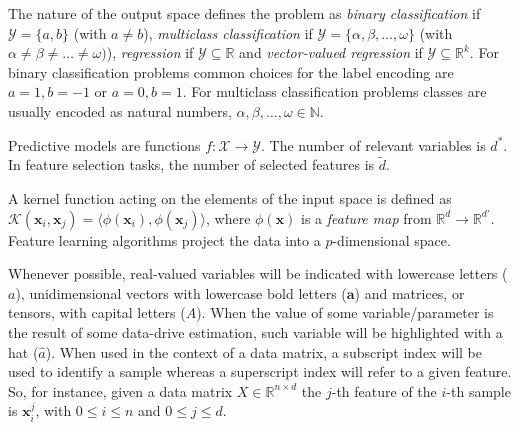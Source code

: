 The nature of the output space defines the problem as \textit{binary classification} if  $\mathcal{Y} = \{a,b\}$ (with $a\neq b$), \textit{multiclass classification} if
$\mathcal{Y} = \{\alpha,\beta,\dots,\omega\}$
(with $\alpha \neq \beta \neq \dots \neq \omega)$),
\textit{regression} if $\mathcal{Y}\subseteq\mathds{R}$ and
\textit{vector-valued regression} if $\mathcal{Y}\subseteq\mathds{R}^k$.
For binary classification problems common choices for the label encoding are $a=1, b=-1$ or $a=0, b=1$.
For multiclass classification problems classes are usually encoded as natural numbers, \ie $\alpha, \beta, \dots, \omega \in \mathbb{N}$.

Predictive models are functions $f: \mathcal{X} \rightarrow \mathcal{Y}$.
The number of relevant variables is $d^*$.
In feature selection tasks, the number of selected features is $\tilde d$.

A kernel function acting on the elements of the input space is defined as $\mathcal{K}(\bm{x}_{i},\bm{x}_{j})=\langle \phi(\bm{x}_{i}), \phi(\bm{x}_{j})\rangle$, where $\phi(\bm{x})$ is a {\em feature map} from $\mathds{R}^d \rightarrow \mathds{R}^{d'}$.
Feature learning algorithms project the data into a $p$-dimensional space.

Whenever possible,
real-valued variables will be indicated with lowercase letters (\eg $a$),
unidimensional vectors with lowercase bold letters (\eg $\bm{a}$) and
matrices, or tensors, with capital letters (\eg $A$).
When the value of some variable/parameter is the result of some data-drive estimation, such variable will be highlighted with a hat (\eg $\hat a$).
When used in the context of a data matrix, a subscript index will be used to identify a sample whereas a superscript index will refer to a given feature.
So, for instance, given a data matrix $X \in \mathbb{R}^{n \times d}$ the $j$-th feature of the $i$-th sample is $\bm{x}_i^j$, with $0 \leq i \leq n$ and $0\leq j\leq d$.
